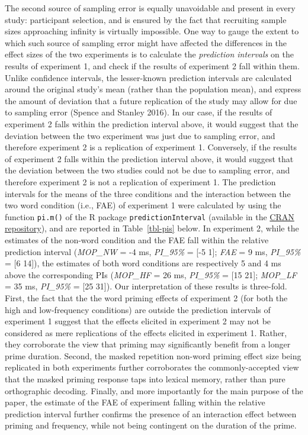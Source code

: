 \documentclass[
]{interact}
\begin{document}
The second source of sampling error is equally unavoidable and present
in every study: participant selection, and is ensured by the fact that
recruiting sample sizes approaching infinity is virtually impossible.
One way to gauge the extent to which such source of sampling error might
have affected the differences in the effect sizes of the two experiments
is to calculate the \emph{prediction intervals} on the results of
experiment 1, and check if the results of experiment 2 fall within them.
Unlike confidence intervals, the lesser-known prediction intervals are
calculated around the original study's mean (rather than the population
mean), and express the amount of deviation that a future replication of
the study may allow for due to sampling error (Spence and Stanley 2016).
In our case, if the results of experiment 2 falls within the prediction
interval above, it would suggest that the deviation between the two
experiment was just due to sampling error, and therefore experiment 2 is
a replication of experiment 1. Conversely, if the results of experiment
2 falls within the prediction interval above, it would suggest that the
deviation between the two studies could not be due to sampling error,
and therefore experiment 2 is not a replication of experiment 1. The
prediction intervals for the means of the three conditions and the
interaction between the two word condition (i.e., FAE) of experiment 1
were calculated by using the function \texttt{pi.m()} of the R package
\texttt{predictionInterval} (available in the
\href{https://cran.r-project.org/web/packages/predictionInterval/predictionInterval.pdf}{CRAN
repository}), and are reported in Table~\ref{tbl-pis} below. In
experiment 2, while the estimates of the non-word condition and the FAE
fall within the relative prediction interval (\emph{MOP\_NW} = -4 ms,
\emph{PI\_95\%} = {[}-5 1{]}; \emph{FAE} = 9 ms, \emph{PI\_95\%} = {[}6
14{]}), the estimates of both word conditions are respectively 5 and 4
ms above the corresponding PIs (\emph{MOP\_HF} = 26 ms, \emph{PI\_95\%}
= {[}15 21{]}; \emph{MOP\_LF} = 35 ms, \emph{PI\_95\%} = {[}25 31{]}).
Our interpretation of these results is three-fold. First, the fact that
the the word priming effects of experiment 2 (for both the high and
low-frequency conditions) are outside the prediction intervals of
experiment 1 suggest that the effects elicited in experiment 2 may not
be considered as mere replications of the effects elicited in experiment
1. Rather, they corroborate the view that priming may significantly
benefit from a longer prime duration. Second, the masked repetition
non-word priming effect size being replicated in both experiments
further corroborates the commonly-accepted view that the masked priming
response taps into lexical memory, rather than pure orthographic
decoding. Finally, and more importantly for the main purpose of the
paper, the estimate of the FAE of experiment falling within the relative
prediction interval further confirms the presence of an interaction
effect between priming and frequency, while not being contingent on the
duration of the prime.
\end{document}
